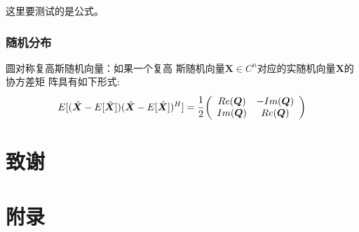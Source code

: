 \documentclass[a4paper,oneside,12pt]{book}
\begin{document}
这里要测试的是公式。

\subsection{随机分布}

\begin{definition}
    圆对称复高斯随机向量：\cite{bib:inproceeding02}如果一个复高
    斯随机向量$\bm{X}\in C^{n}$对应的实随机向量$\bm{X}$的协方差矩
    阵具有如下形式:
    \begin{equation}
        E[(\hat{\bm{X}}-E[\hat{\boldsymbol{X}}])
        (\hat{\bm{X}}-E[\hat{\boldsymbol{X}}])^{H}]
        =\cfrac{1}{2}
        \begin{array}({cc})
            Re(\bm{Q}) & -Im(\boldsymbol{Q}) \\
            Im(\bm{Q}) & Re(\boldsymbol{Q}) \\
        \end{array}
    \end{equation}
\end{definition}


\clearpage{}


\clearpage{}
\chapter*{致\qquad{}谢}
\normalsize\thankwords

\clearpage{}
\chapter*{附\qquad{}录}

\end{document}
